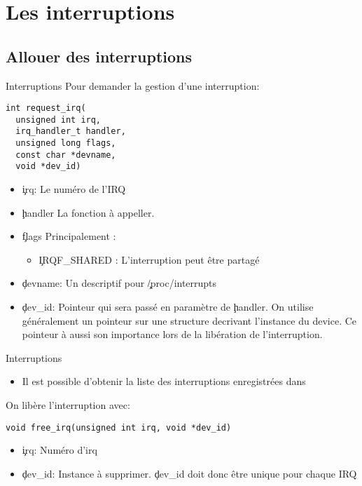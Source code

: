 \section{Les interruptions}

\subsection{Allouer des interruptions}

\begin{frame}[fragile=singleslide]{Interruptions}
  Pour demander la gestion d'une interruption:
  \begin{lstlisting}  
int request_irq(
  unsigned int irq, 
  irq_handler_t handler, 
  unsigned long flags, 
  const char *devname, 
  void *dev_id)
  \end{lstlisting} 
  \begin{itemize} 
  \item \c{irq}: Le numéro de l'IRQ
  \item \c{handler} La fonction à appeller.
  \item \c{flags} Principalement : 
    \begin{itemize} 
    \item \c{IRQF_SHARED} : L'interruption peut être partagé
    \end{itemize} 
  \item \c{devname}: Un descriptif pour \c{/proc/interrupts}
  \item  \c{dev_id}:   Pointeur  qui   sera  passé  en   paramètre  de
    \c{handler}. On utilise généralement un pointeur sur une structure
    decrivant l'instance du device. Ce pointeur à aussi son importance
    lors de la libération de l'interruption.
  \end{itemize}
\end{frame}

\begin{frame}[fragile=singleslide]{Interruptions}
  \begin{itemize} 
  \item  Il   est  possible  d'obtenir  la   liste  des  interruptions
    enregistrées dans 
  \end{itemize} 
  On libère l'interruption avec:
  \begin{lstlisting} 
void free_irq(unsigned int irq, void *dev_id)
  \end{lstlisting} 
  \begin{itemize} 
  \item \c{irq}: Numéro d'irq
  \item \c{dev_id}:  Instance à  supprimer. \c{dev_id} doit  donc être
    unique pour chaque IRQ
  \end{itemize}
\end{frame}

